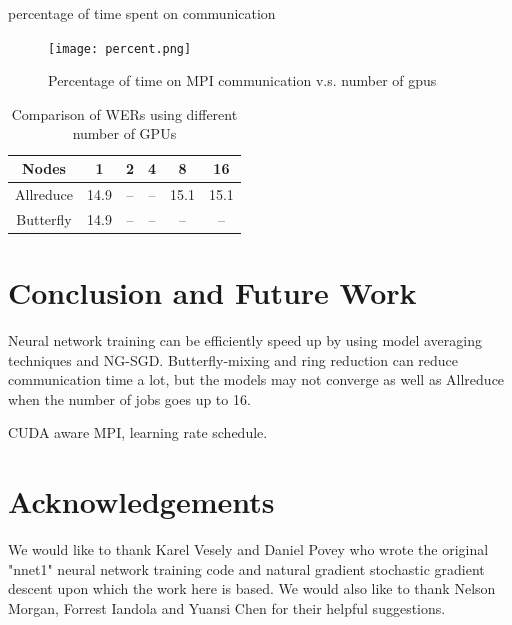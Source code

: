 \documentclass{article}
\begin{document}
percentage of time spent on communication
\begin{figure}[htb]
  \centering
  \texttt{[image: percent.png]}
  \caption{Percentage of time on MPI communication v.s. number of gpus}
  \label{fig:percent}
\end{figure}

\begin{table}
  \centering
  \begin{tabular}{c|c|c|c|c|c}
    \hline
     Nodes  & 1    & 2    & 4    & 8    & 16 \\
    \hline
Allreduce &    14.9 & -- & -- & 15.1 & 15.1 \\
    \hline
Butterfly &    14.9 & -- & -- & -- & --\\
    \hline
  \end{tabular}
  \caption{Comparison of WERs using different number of GPUs }
  \label{tab:wer}
\end{table}


\section{Conclusion and Future Work}
Neural network training can be efficiently speed up by using model averaging techniques and NG-SGD. 
Butterfly-mixing and ring reduction can reduce communication time a lot, but the models may not converge as well as 
Allreduce when the number of jobs goes up to 16.


CUDA aware MPI, learning rate schedule.


\section{Acknowledgements}
We would like to thank Karel Vesely and Daniel Povey who wrote the original "nnet1" neural network training code
and natural gradient stochastic gradient descent upon which the work here is based. We would also like to thank Nelson 
Morgan, Forrest Iandola and Yuansi Chen for their helpful suggestions.



\end{document}
